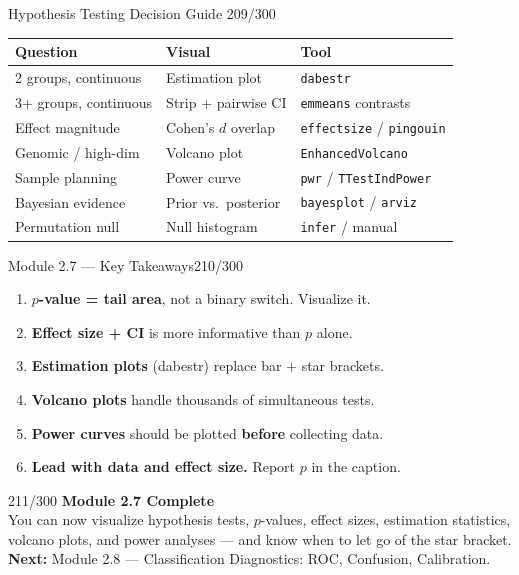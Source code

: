 \documentclass[10pt]{beamer}
\newcommand{\smark}[1]{\hfill{\scriptsize\color{codegray}#1}}
\begin{document}
\begin{frame}{Hypothesis Testing Decision Guide}
\smark{209/300}
\centering\small
\begin{tabular}{@{}lll@{}}
    \toprule
    \textbf{Question} & \textbf{Visual} & \textbf{Tool} \\
    \midrule
    2 groups, continuous     & Estimation plot      & \texttt{dabestr} \\
    3+ groups, continuous    & Strip + pairwise CI  & \texttt{emmeans} contrasts \\
    Effect magnitude         & Cohen's $d$ overlap  & \texttt{effectsize} / \texttt{pingouin} \\
    Genomic / high-dim       & Volcano plot         & \texttt{EnhancedVolcano} \\
    Sample planning          & Power curve          & \texttt{pwr} / \texttt{TTestIndPower} \\
    Bayesian evidence        & Prior vs.\ posterior & \texttt{bayesplot} / \texttt{arviz} \\
    Permutation null         & Null histogram       & \texttt{infer} / manual \\
    \bottomrule
\end{tabular}
\end{frame}

\begin{frame}{Module 2.7 --- Key Takeaways}\smark{210/300}
\begin{enumerate}
    \item \textbf{$p$-value = tail area}, not a binary switch. Visualize it.
    \item \textbf{Effect size + CI} is more informative than $p$ alone.
    \item \textbf{Estimation plots} (dabestr) replace bar + star brackets.
    \item \textbf{Volcano plots} handle thousands of simultaneous tests.
    \item \textbf{Power curves} should be plotted \textbf{before} collecting data.
    \item \textbf{Lead with data and effect size.} Report $p$ in the caption.
\end{enumerate}
\end{frame}

\begin{frame}{}\smark{211/300}
\centering\vspace{1.5cm}
{\Large\textbf{Module 2.7 Complete}}\\[0.5cm]
You can now visualize hypothesis tests, $p$-values, effect sizes, estimation statistics, volcano plots, and power analyses --- and know when to let go of the star bracket.\\[0.5cm]
\textbf{Next:} Module 2.8 --- Classification Diagnostics: ROC, Confusion, Calibration.
\end{frame}
\end{document}
